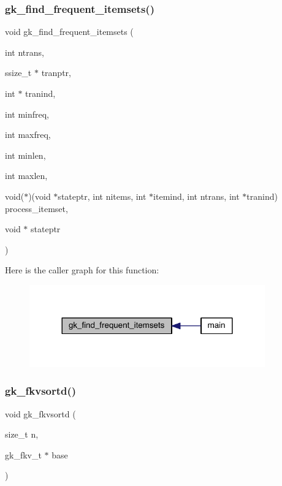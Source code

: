\subsubsection{\texorpdfstring{gk\+\_\+find\+\_\+frequent\+\_\+itemsets()}{gk\_find\_frequent\_itemsets()}}
{\footnotesize\ttfamily void gk\+\_\+find\+\_\+frequent\+\_\+itemsets (\begin{DoxyParamCaption}\item[{int}]{ntrans,  }\item[{ssize\+\_\+t $\ast$}]{tranptr,  }\item[{int $\ast$}]{tranind,  }\item[{int}]{minfreq,  }\item[{int}]{maxfreq,  }\item[{int}]{minlen,  }\item[{int}]{maxlen,  }\item[{void($\ast$)(void $\ast$stateptr, int nitems, int $\ast$itemind, int ntrans, int $\ast$tranind)}]{process\+\_\+itemset,  }\item[{void $\ast$}]{stateptr }\end{DoxyParamCaption})}

Here is the caller graph for this function\+:\nopagebreak
\begin{figure}[H]
\begin{center}
\leavevmode
\includegraphics[width=288pt]{a00077_a49ce3918c2232fa7e293e4221d5215b1_icgraph}
\end{center}
\end{figure}
\mbox{\label{a00077_aa28cb87d9cb87860a5b1e23a94d7bba8}} 
\subsubsection{\texorpdfstring{gk\+\_\+fkvsortd()}{gk\_fkvsortd()}}
{\footnotesize\ttfamily void gk\+\_\+fkvsortd (\begin{DoxyParamCaption}\item[{size\+\_\+t}]{n,  }\item[{gk\+\_\+fkv\+\_\+t $\ast$}]{base }\end{DoxyParamCaption})}


